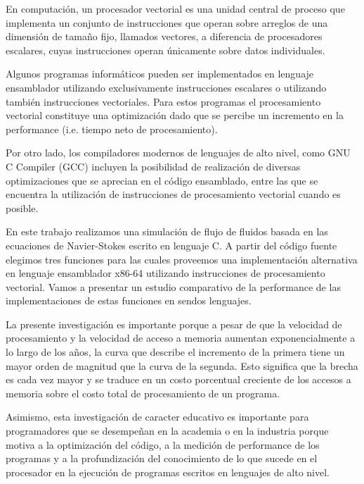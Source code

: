 En computación, un procesador vectorial es una unidad central de proceso que implementa un conjunto de instrucciones que operan sobre arreglos de una dimensión de tamaño fijo, llamados vectores, a diferencia de procesadores escalares, cuyas instrucciones operan únicamente sobre datos individuales.
\par Algunos programas informáticos pueden ser implementados en lenguaje ensamblador utilizando exclusivamente instrucciones escalares o utilizando también instrucciones vectoriales. Para estos programas el procesamiento vectorial constituye una optimización dado que se percibe un incremento en la performance (i.e. tiempo neto de procesamiento).
\par Por otro lado, los compiladores modernos de lenguajes de alto nivel, como GNU C Compiler (GCC) incluyen la posibilidad de realización de diversas optimizaciones que se aprecian en el código ensamblado, entre las que se encuentra la utilización de instrucciones de procesamiento vectorial cuando es posible.
\par En este trabajo realizamos una simulación de flujo de fluidos basada en las ecuaciones de Navier-Stokes escrito en lenguaje C. A partir del código fuente elegimos tres funciones para las cuales proveemos una implementación alternativa en lenguaje ensamblador x86-64 utilizando instrucciones de procesamiento vectorial. Vamos a presentar un estudio comparativo de la performance de las implementaciones de estas funciones en sendos lenguajes.
\par La presente investigación es importante porque a pesar de que la velocidad de procesamiento y la velocidad de acceso a memoria aumentan exponencialmente a lo largo de los años, la curva que describe el incremento de la primera tiene un mayor orden de magnitud que la curva de la segunda. Esto significa que la brecha es cada vez mayor y se traduce en un costo porcentual creciente de los accesos a memoria sobre el costo total de procesamiento de un programa.
\par Asimismo, esta investigación de caracter educativo es importante para programadores que se desempeñan en la academia o en la industria porque motiva a la optimización del código, a la medición de performance de los programas y a la profundización del conocimiento de lo que sucede en el procesador en la ejecución de programas escritos en lenguajes de alto nivel.
